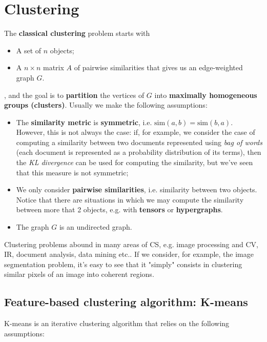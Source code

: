 \section{Clustering}

The \textbf{classical clustering} problem starts with 

\begin{itemize}
    \item A set of $n$ objects;
    \item A $n \times n$ matrix $A$ of pairwise similarities that gives us an edge-weighted graph $G$.
\end{itemize}

, and the goal is to \textbf{partition} the vertices of $G$ into \textbf{maximally homogeneous groups (clusters)}. Usually we make the following assumptions:

\begin{itemize}
    \item The \textbf{similarity metric} is \textbf{symmetric}, i.e. $\text{sim}(a,b) = \text{sim}(b,a)$. However, this is not always the case: if, for example, we consider the case of computing a similarity between two documents represented using \textit{bag of words} (each document is represented as a probability distribution of its terms), then the \textit{KL divergence} can be used for computing the similarity, but we've seen that this measure is not symmetric;
    \item We only consider \textbf{pairwise similarities}, i.e. similarity between two objects. Notice that there are situations in which we may compute the similarity between more that 2 objects, e.g. with \textbf{tensors} or \textbf{hypergraphs}.
    \item The graph $G$ is an undirected graph.
\end{itemize}


Clustering problems abound in many areas of CS, e.g. image processing and CV, IR, document analysis, data mining etc.. If we consider, for example, the image segmentation problem, it's easy to see that it "simply" consists in clustering similar pixels of an image into coherent regions. 

\subsection{Feature-based clustering algorithm: K-means}
K-means is an iterative clustering algorithm that relies on the following assumptions:

